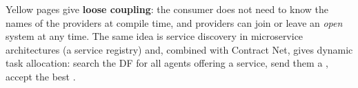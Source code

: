 \begin{nbwhy}
\notinslides
Yellow pages give \textbf{loose coupling}: the consumer does not need to know the names of
the providers at compile time, and providers can join or leave an \emph{open} system at any
time. The same idea is service discovery in microservice architectures (a service registry)
and, combined with Contract Net, gives dynamic task allocation: search the DF for all agents
offering a service, send them a , accept the best .
\end{nbwhy}
